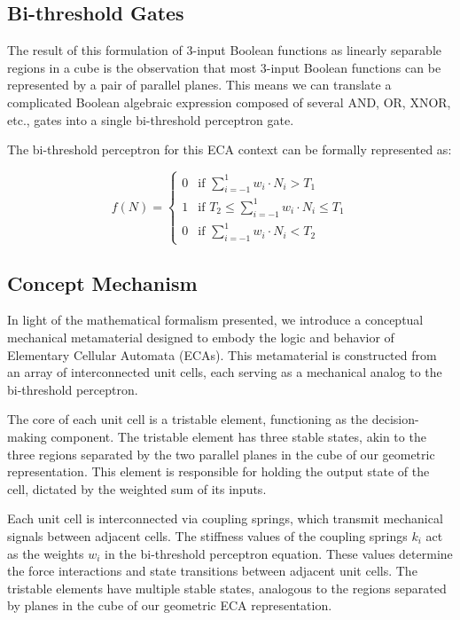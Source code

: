 \subsection*{Bi-threshold Gates}

The result of this formulation of 3-input Boolean functions as linearly separable regions in a cube is the observation that most 3-input Boolean functions can be represented by a pair of parallel planes. This means we can translate a complicated Boolean algebraic expression composed of several AND, OR, XNOR, etc., gates into a single bi-threshold perceptron gate.

The bi-threshold perceptron for this ECA context can be formally represented as:

\[
f(N) = \begin{cases} 
0 & \text{if } \sum_{i=-1}^{1} w_i \cdot N_i > T_1 \\
1 & \text{if } T_2 \leq \sum_{i=-1}^{1} w_i \cdot N_i \leq T_1 \\
0 & \text{if } \sum_{i=-1}^{1} w_i \cdot N_i < T_2
\end{cases}
\]


\subsection*{Concept Mechanism}

In light of the mathematical formalism presented, we introduce a conceptual mechanical metamaterial designed to embody the logic and behavior of Elementary Cellular Automata (ECAs). This metamaterial is constructed from an array of interconnected unit cells, each serving as a mechanical analog to the bi-threshold perceptron.

The core of each unit cell is a tristable element, functioning as the decision-making component. The tristable element has three stable states, akin to the three regions separated by the two parallel planes in the cube of our geometric representation. This element is responsible for holding the output state of the cell, dictated by the weighted sum of its inputs.

Each unit cell is interconnected via coupling springs, which transmit mechanical signals between adjacent cells. The stiffness values of the coupling springs \(k_i\) act as the weights \( w_i \) in the bi-threshold perceptron equation. These values determine the force interactions and state transitions between adjacent unit cells. The tristable elements have multiple stable states, analogous to the regions separated by planes in the cube of our geometric ECA representation.

